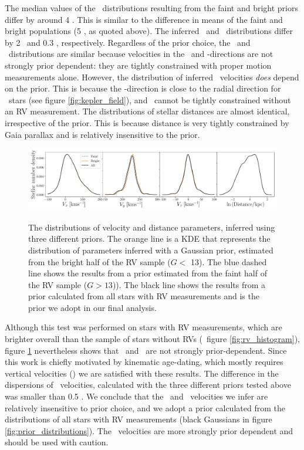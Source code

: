 The median values of the \vy\ distributions resulting from the faint and
bright priors differ by around 4 \kms.
This is similar to the difference in means of the faint and bright populations
(5 \kms, as quoted above).
The inferred \vx\ and \vz\ distributions differ by 2 \kms\ and 0.3 \kms,
respectively.
Regardless of the prior choice, the \vx\ and \vz\ distributions are similar
because velocities in the \x\ and \z-directions are not strongly prior
dependent: they are tightly constrained with proper motion measurements alone.
However, the distribution of inferred \vy\ velocities {\it does} depend on the
prior.
This is because the \y-direction is close to the radial direction for \kepler\
stars (see figure \ref{fig:kepler_field}), and \vy\ cannot be tightly
constrained without an RV measurement.
The distributions of stellar distances are almost identical, irrespective of
the prior.
This is because distance is very tightly constrained by Gaia parallax and is
relatively insensitive to the prior.
\begin{figure}[ht!]
\caption{
The distributions of velocity and distance parameters, inferred using three
    different priors.
The orange line is a KDE that represents the distribution of parameters
    inferred with a Gaussian prior, estimated from the bright half of the RV
    sample ($G < $ 13).
The blue dashed line shows the results from a prior estimated from the faint
    half of the RV sample ($G > 13$)).
The black line shows the results from a prior calculated from all stars with
    RV measurements and is the prior we adopt in our final analysis.
    }
  \centering
    \includegraphics[width=1\textwidth]{prior_comparison}
\label{fig:prior_comparison}
\end{figure}


Although this test was performed on stars with RV measurements, which are
brighter overall than the sample of stars without RVs (\eg\ figure
\ref{fig:rv_histogram}), figure \ref{fig:prior_comparison} nevertheless shows
that \vx\ and \vz\ are not strongly prior-dependent.
Since this work is chiefly motivated by kinematic age-dating, which mostly
requires vertical velocities (\vz) we are satisfied with these results.
The difference in the dispersions of \vz\ velocities, calculated with the
three different priors tested above was smaller than 0.5 \kms.
We conclude that the \vx\ and \vz\ velocities we infer are relatively
insensitive to prior choice, and we adopt a prior calculated from the
distributions of all stars with RV measurements (black Gaussians in figure
\ref{fig:prior_distributions}).
The \vy\ velocities are more strongly prior dependent and should be used with
caution.

